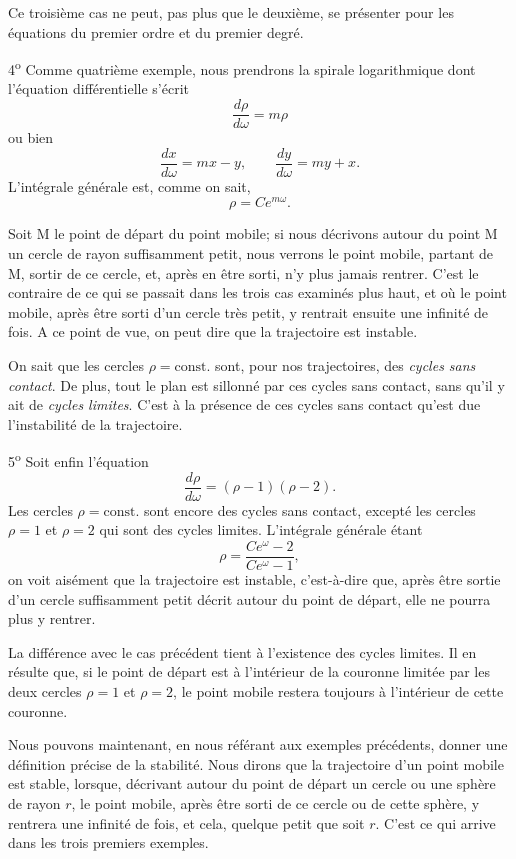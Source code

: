\documentclass[11pt]{article}
\begin{document}
Ce troisième cas ne peut, pas plus que le deuxième, se présenter pour les équations du premier ordre et du premier degré.

4\textsuperscript{o} Comme quatrième exemple, nous prendrons la spirale logarithmique dont l’équation différentielle s’écrit
\[
\frac{d\rho}{d\omega}=m\rho
\]
ou bien
\[
\frac{dx}{d\omega}=mx-y,
\qquad
\frac{dy}{d\omega}=my+x.
\]
L’intégrale générale est, comme on sait,
\[
\rho=Ce^{m\omega}.
\]

Soit M le point de départ du point mobile; si nous décrivons autour du point M un cercle de rayon suffisamment petit, nous verrons le point mobile, partant de M, sortir de ce cercle, et, après en être sorti, n’y plus jamais rentrer. C’est le contraire de ce qui se passait dans les trois cas examinés plus haut, et où le point mobile, après être sorti d’un cercle très petit, y rentrait ensuite une infinité de fois. A ce point de vue, on peut dire que la trajectoire est instable.

On sait que les cercles $\rho=\mathrm{const.}$ sont, pour nos trajectoires, des \emph{cycles sans contact}. De plus, tout le plan est sillonné par ces cycles sans contact, sans qu’il y ait de \emph{cycles limites}. C’est à la présence de ces cycles sans contact qu’est due l’instabilité de la trajectoire.

5\textsuperscript{o} Soit enfin l’équation
\[
\frac{d\rho}{d\omega}=(\rho-1)(\rho-2).
\]
Les cercles $\rho=\mathrm{const.}$ sont encore des cycles sans contact, excepté les cercles $\rho=1$ et $\rho=2$ qui sont des cycles limites. L’intégrale générale étant
\[
\rho=\frac{Ce^\omega-2}{Ce^\omega-1},
\]
on voit aisément que la trajectoire est instable, c’est-à-dire que, après être sortie d’un cercle suffisamment petit décrit autour du point de départ, elle ne pourra plus y rentrer.

La différence avec le cas précédent tient à l’existence des cycles limites. Il en résulte que, si le point de départ est à l’intérieur de la couronne limitée par les deux cercles $\rho=1$ et $\rho=2$, le point mobile restera toujours à l’intérieur de cette couronne.

Nous pouvons maintenant, en nous référant aux exemples précédents, donner une définition précise de la stabilité. Nous dirons que la trajectoire d’un point mobile est stable, lorsque, décrivant autour du point de départ un cercle ou une sphère de rayon $r$, le point mobile, après être sorti de ce cercle ou de cette sphère, y rentrera une infinité de fois, et cela, quelque petit que soit $r$. C’est ce qui arrive dans les trois premiers exemples.
\end{document}
